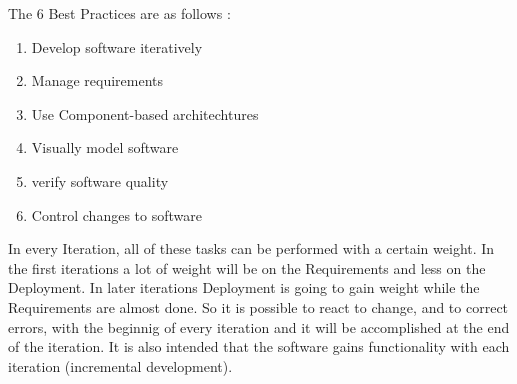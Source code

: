 \documentclass[
	11pt,
	a4paper
]{article}%
\begin{document}
The 6 Best Practices are as follows :
\begin{enumerate}
\item Develop software iteratively
\item Manage requirements
\item Use Component-based architechtures
\item Visually model software
\item verify software quality
\item Control changes to software
\end{enumerate}

In every Iteration, all of these tasks can be performed with a certain weight. In the first iterations a lot of weight will be on the Requirements and less on the Deployment. In later iterations Deployment is going to gain weight while the Requirements are almost done. So it is possible to react to change, and to correct errors, with the beginnig of every iteration and it will be accomplished at the end of the iteration. It is also intended that the software gains functionality with each iteration (incremental development).
\end{document}
